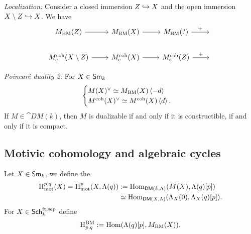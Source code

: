 \emph{Localization:} Consider a closed immersion $Z\hookrightarrow X$ and the open immersion
$X\setminus Z\hookrightarrow X$. We have
\[
\begin{tikzcd}
M_{\text{BM}}(Z) \ar[r] & M_{\text{BM}}(X) \ar[r] & M_{\text{BM}}(?) \ar[r,"+"] & {} \\
M^{\text{coh}}_{\text{c}}(X\setminus Z) \ar[r] & M^{\text{coh}}_{\text{c}}(X) \ar[r] &
M^{\text{coh}}_{\text{c}}(Z) \ar[r,"+"] & {}
\end{tikzcd}
\]

\emph{Poincar\'e duality 2:} For $X\in \mathsf{Sm}_k$
\[
\begin{cases}
M(X)^{\vee} \simeq M_{\text{BM}}(X)\left<-d \right> \\
M^{\text{coh}}(X)^{\vee} \simeq M^{\text{coh}}(X)\left<d \right>.
\end{cases}
\]
If $M\in\cat{DM}(k)$, then $M$ is dualizable if and only if it is constructible, if and
only if it is compact.

\subsection{Motivic cohomology and algebraic cycles}
\begin{definition}
Let $X\in \mathsf{Sm}_k$, we define the 
\begin{align*}
\mathrm{H}_{\text{mot}}^{p,q}(X) = \mathrm{H}_{\text{mot}}^{p}(X,\Lambda(q)) &:=
\operatorname{Hom}_{\mathsf{DM}(k,\Lambda)}(M(X), \Lambda(q)[p]) \\
&\simeq \operatorname{Hom}_{\mathsf{DM}(X,\Lambda)}(\Lambda_X(0), \Lambda_X(q)[p]).
\end{align*}
For $X\in \mathsf{Sch}_k^{\text{ft,sep}}$ define
\[
\mathrm{H}_{p,q}^{\text{BM}} := \operatorname{Hom}(\Lambda(q)[p], M_{\text{BM}}(X)).
\]
\end{definition}
